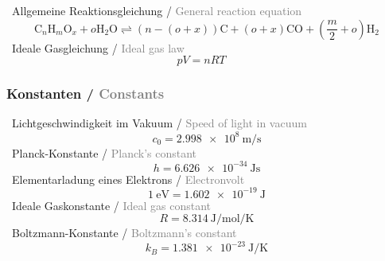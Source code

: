 \documentclass[12pt,a4paper]{article}
\def\gray#1{\textcolor{gray}{#1}}
\begin{document}
%
\vspace{0.15cm}
\-\ Allgemeine Reaktionsgleichung / \gray{General reaction equation}
\begin{equation}
    \text{C}_n\text{H}_m\text{O}_x + o\text{H}_2\text{O} \rightleftharpoons (n - (o + x))\text{C} + (o + x)\text{CO} + \left(\frac{m}{2} + o\right)\text{H}_2
\end{equation}
\-\ Ideale Gasgleichung / \gray{Ideal gas law}
\begin{equation}
    pV = nRT \quad 
\end{equation}
%
\newpage
%
\begin{center}
\subsubsection*{Konstanten / \gray{Constants}}
\end{center}
%
\vspace{0.15cm}
\-\ Lichtgeschwindigkeit im Vakuum / \gray{Speed of light in vacuum}
    \begin{equation}
        c_0 = \SI{2.998e8}{\metre\per\second}
    \end{equation}
%
\-\ Planck-Konstante / \gray{Planck's constant}
    \begin{equation}
        h = \SI{6.626e-34}{\joule\second}
    \end{equation}
%
\-\ Elementarladung eines Elektrons / \gray{Electronvolt}
    \begin{equation}
        \SI{1}{\electronvolt} = \SI{1.602e-19}{\joule}
    \end{equation}
%
\-\ Ideale Gaskonstante / \gray{Ideal gas constant}
    \begin{equation}
        R = \SI{8.314}{\joule\per\mole\per\kelvin}
    \end{equation}
%
\-\ Boltzmann-Konstante / \gray{Boltzmann's constant}
    \begin{equation}
        k_B = \SI{1.381e-23}{\joule\per\kelvin}
    \end{equation}
%
\end{document}

